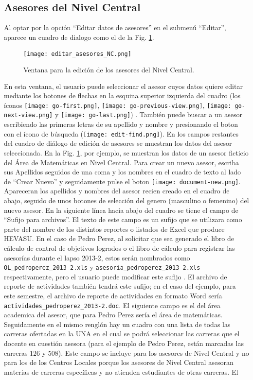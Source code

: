 \documentclass[letterpaper,12pt]{book}
\newcommand{\archivo}[1]
{\texttt{#1}}
\begin{document}
\subsection{Asesores del Nivel Central}

Al optar por la opción ``Editar datos de asesores'' en el submenú ``Editar'', aparece un cuadro de dialogo como el de la Fig. \ref{fig:editar_asesores_NC}.\label{sec:editar_asesores_NC}

\begin{figure}[!ht]
  \centering
  \texttt{[image: editar\_asesores\_NC.png]}
  \caption{Ventana para la edición de los asesores del Nivel Central.}
  \label{fig:editar_asesores_NC}
\end{figure}

En esta ventana, el usuario puede seleccionar el asesor cuyos datos quiere editar mediante los botones de flechas en la esquina superior izquierda del cuadro (los íconos \texttt{[image: go-first.png]}, \texttt{[image: go-previous-view.png]}, \texttt{[image: go-next-view.png]} y \texttt{[image: go-last.png]}) . También puede buscar a un asesor escribiendo las primeras letras de su apellido y nombre y presionando el boton con el ícono de búsqueda (\texttt{[image: edit-find.png]}). En los campos restantes del cuadro de diálogo de edición de asesores se muestran los datos del asesor seleccionada. En la Fig. \ref{fig:editar_asesores_NC}, por ejemplo, se muestran los datos de un asesor ficticio del Área de Matemáticas en Nivel Central. Para crear un nuevo asesor, escriba sus Apellidos seguidos de una coma y los nombres en el cuadro de texto al lado de ``Crear Nuevo'' y seguidamente pulse el boton \texttt{[image: document-new.png]}. Apareceran los apellidos y nombres del asesor recien creado en el cuadro de abajo, seguido de unos botones de selección del genero (masculino o femenino) del nuevo asesor. En la siguiente línea hacia abajo del cuadro se tiene el campo de ``Sufijo para archivos''. El texto de este campo es un sufijo que se utilizara como parte del nombre de los distintos reportes o listados de Excel que produce HEVASU. En el  caso de Pedro Perez, al solicitar que sea generado el libro de cálculo de control de objetivos logrados o el libro de cálculo para registrar las asesorías durante el lapso 2013-2, estos serán nombrados como \archivo{OL\_pedroperez\_2013-2.xls} y \archivo{asesoria\_pedroperez\_2013-2.xls} respectivamente, pero el usuario puede modificar este sufijo . El archivo de reporte de actividades también tendrá este sufijo; en el caso del ejemplo, para este semestre, el archivo de reporte de actividades en formato Word sería \archivo{actividades\_pedroperez\_2013-2.doc}. El siguiente campo es el del área academica del asesor, que para Pedro Perez sería el área de matemáticas. Seguidamente en el mismo renglón hay un cuadro con una lista de todas las carreras ofertadas en la UNA en el cual se podrá seleccionar las carreras que el docente en cuestión asesora (para el ejemplo de Pedro Perez, están marcadas las carreras 126 y 508). Este campo se incluye para los asesores de Nivel Central y no para los de los Centros Locales porque los asesores de Nivel Central asesoran materias de carreras específicas y no atienden estudiantes de otras carreras. El 
\end{document}
